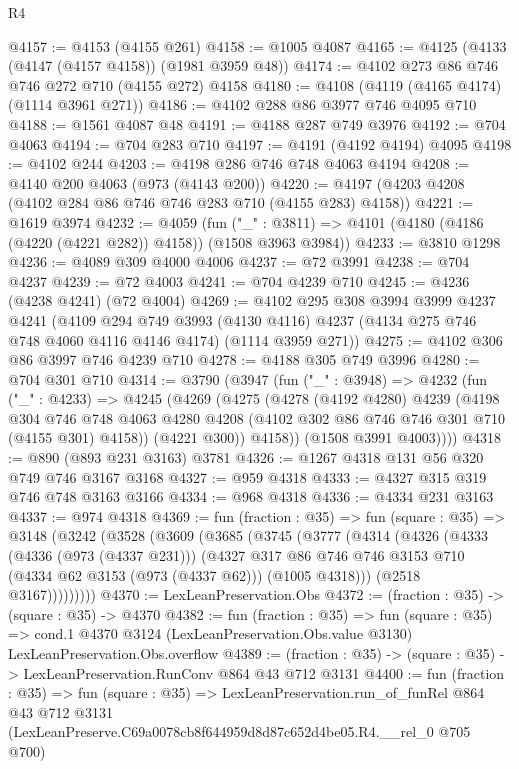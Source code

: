 \begin{lexlean}{R4}
\begin{coremodule}
@4157 := @4153 (@4155 @261)
@4158 := @1005 @4087
@4165 := @4125 (@4133 (@4147 (@4157 @4158)) (@1981 @3959 @48))
@4174 := @4102 @273 @86 @746 @746 @272 @710 (@4155 @272) @4158
@4180 := @4108 (@4119 (@4165 @4174) (@1114 @3961 @271))
@4186 := @4102 @288 @86 @3977 @746 @4095 @710
@4188 := @1561 @4087 @48
@4191 := @4188 @287 @749 @3976
@4192 := @704 @4063
@4194 := @704 @283 @710
@4197 := @4191 (@4192 @4194) @4095
@4198 := @4102 @244
@4203 := @4198 @286 @746 @748 @4063 @4194
@4208 := @4140 @200 @4063 (@973 (@4143 @200))
@4220 := @4197 (@4203 @4208 (@4102 @284 @86 @746 @746 @283 @710 (@4155 @283) @4158))
@4221 := @1619 @3974
@4232 := @4059
    (fun ("_" : @3811) => @4101 (@4180 (@4186 (@4220 (@4221 @282)) @4158)) (@1508 @3963 @3984))
@4233 := @3810 @1298
@4236 := @4089 @309 @4000 @4006
@4237 := @72 @3991
@4238 := @704 @4237
@4239 := @72 @4003
@4241 := @704 @4239 @710
@4245 := @4236 (@4238 @4241) (@72 @4004)
@4269 := @4102
    @295
    @308
    @3994
    @3999
    @4237
    @4241
    (@4109
      @294
      @749
      @3993
      (@4130 @4116)
      @4237
      (@4134 @275 @746 @748 @4060 @4116 @4146 @4174)
      (@1114 @3959 @271))
@4275 := @4102 @306 @86 @3997 @746 @4239 @710
@4278 := @4188 @305 @749 @3996
@4280 := @704 @301 @710
@4314 := @3790
    (@3947
      (fun ("_" : @3948) =>
      @4232
        (fun ("_" : @4233) =>
        @4245
          (@4269
            (@4275
              (@4278
                (@4192 @4280)
                @4239
                (@4198
                  @304
                  @746
                  @748
                  @4063
                  @4280
                  @4208
                  (@4102 @302 @86 @746 @746 @301 @710 (@4155 @301) @4158))
                (@4221 @300))
              @4158))
          (@1508 @3991 @4003))))
@4318 := @890 (@893 @231 @3163) @3781
@4326 := @1267 @4318 @131 @56 @320 @749 @746 @3167 @3168
@4327 := @959 @4318
@4333 := @4327 @315 @319 @746 @748 @3163 @3166
@4334 := @968 @4318
@4336 := @4334 @231 @3163
@4337 := @974 @4318
@4369 := fun (fraction : @35) =>
  fun (square : @35) =>
  @3148
    (@3242
      (@3528
        (@3609
          (@3685
            (@3745
              (@3777
                (@4314
                  (@4326
                    (@4333
                      (@4336 (@973 (@4337 @231)))
                      (@4327
                        @317
                        @86
                        @746
                        @746
                        @3153
                        @710
                        (@4334 @62 @3153 (@973 (@4337 @62)))
                        (@1005 @4318)))
                    (@2518 @3167)))))))))
@4370 := LexLeanPreservation.Obs
@4372 := (fraction : @35) -> (square : @35) -> @4370
@4382 := fun (fraction : @35) =>
  fun (square : @35) =>
  cond.{1} @4370 @3124 (LexLeanPreservation.Obs.value @3130) LexLeanPreservation.Obs.overflow
@4389 := (fraction : @35) -> (square : @35) -> LexLeanPreservation.RunConv @864 @43 @712 @3131
@4400 := fun (fraction : @35) =>
  fun (square : @35) =>
  LexLeanPreservation.run_of_funRel
    @864
    @43
    @712
    @3131
    (LexLeanPreserve.C69a0078cb8f644959d8d87c652d4be05.R4.__rel_0 @705 @700)
\end{coremodule}
\end{lexlean}

